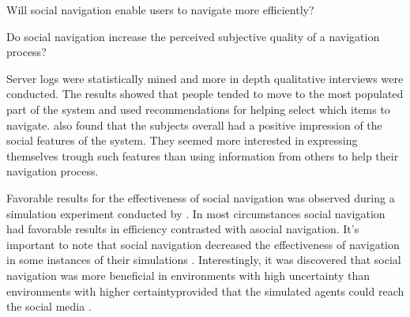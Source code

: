 \begin{enum}
  \item Will social navigation enable users to navigate more efficiently?
  \item Do social navigation increase the perceived subjective quality of
    a navigation process?
\end{enum}

Server logs were statistically mined and more in depth qualitative interviews
were conducted. The results showed that people tended to move to the most
populated part of the system and used recommendations for helping select which
items to navigate. \citeauthor{svensson05} also found that the subjects
overall had a positive impression of the social features of the system. They
seemed more interested in expressing themselves trough such features than
using information from others to help their navigation process.

Favorable results for the effectiveness of social navigation was observed
during a simulation experiment conducted by \citeauthor{riedl03}. In most
circumstances social navigation had favorable results in efficiency contrasted
with asocial navigation. It's important to note that social navigation
decreased the effectiveness of navigation in some instances of their
simulations \citeyearpar[]{riedl03}.
Interestingly, it was discovered that social navigation was more
beneficial in environments with high uncertainty%
than environments with higher certainty\dash{}provided that the
simulated agents could reach the social media
\citeyearpar[]{riedl03}. 

